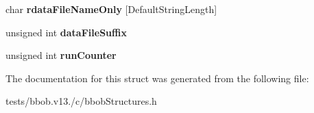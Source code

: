 \begin{DoxyCompactItemize}
\item 
\hypertarget{structparamStruct_afa6b9b2cd041cc98de395a1e7eb4b9db}{char {\bfseries rdata\-File\-Name\-Only} \mbox{[}Default\-String\-Length\mbox{]}}\label{structparamStruct_afa6b9b2cd041cc98de395a1e7eb4b9db}

\item 
\hypertarget{structparamStruct_ae85f6bb2f0604338bc1d469a267e4382}{unsigned int {\bfseries data\-File\-Suffix}}\label{structparamStruct_ae85f6bb2f0604338bc1d469a267e4382}

\item 
\hypertarget{structparamStruct_a34a46723144a9d6e55c3140a7b72cd76}{unsigned int {\bfseries run\-Counter}}\label{structparamStruct_a34a46723144a9d6e55c3140a7b72cd76}

\end{DoxyCompactItemize}


The documentation for this struct was generated from the following file\-:\begin{DoxyCompactItemize}
\item 
tests/bbob.\-v13./c/bbob\-Structures.\-h\end{DoxyCompactItemize}
